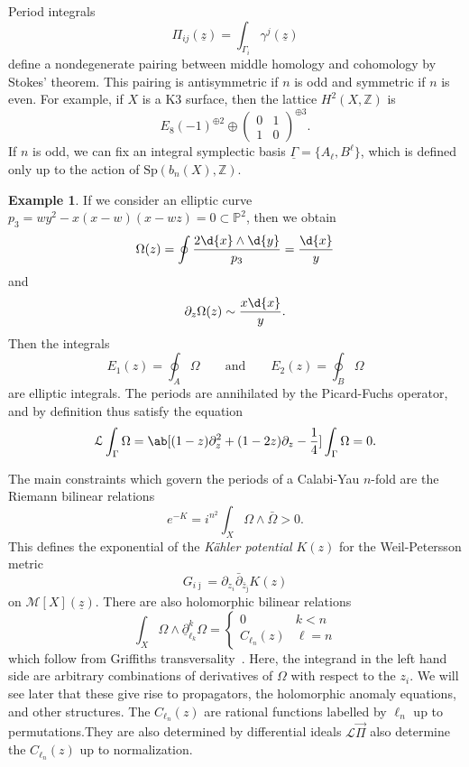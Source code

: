 \documentclass[10pt,oldfontcommands,oneside]{memoir}
\theoremstyle{definition}
\newtheorem{exm}[thm]{Example}
\theoremstyle{remark}
\theoremstyle{plain}
\theoremstyle{definition}
\theoremstyle{remark}
\newcommand{\Z}{\mathbb{Z}}
\renewcommand{\P}{\mathbb{P}}
\newcommand{\mc}[1]{\mathcal{#1}}
\newcommand{\uz}{\ul{z}}
\newcommand{\mr}[1]{\mathrm{#1}}
\newcommand{\ul}[1]{\underline{#1}}
\newcommand{\1}{\mathbf{1}}
\newcommand{\2}{\mathbf{2}}
\newcommand{\3}{\mathbf{3}}
\begin{document}
Period integrals
\[ \Pi_{ij}(\uz) = \int_{\Gamma_i} \gamma^j(\uz) \]
define a nondegenerate pairing between middle homology and cohomology by Stokes' theorem. This pairing is antisymmetric if $n$ is odd and symmetric if $n$ is even. For example, if $X$ is a K3 surface, then the lattice $H^2(X,\Z)$ is
\[ E_8(-1)^{\oplus 2} \oplus \begin{pmatrix}
    0 & 1 \\
    1 & 0
\end{pmatrix}^{\oplus 3}.
\]
If $n$ is odd, we can fix an integral symplectic basis $\ul{\Gamma} = \{A_{\ell}, B^{\ell}\}$, which is defined only up to the action of $\mr{Sp}(b_n(X), \Z)$.

\begin{exm}
    If we consider an elliptic curve $p_3 = wy^2-x(x-w)(x-wz) = 0 \subset \P^2$, then we obtain
    \[ \Omega(z) = \oint \frac{2 \d{x} \wedge \d{y}}{p_3} = \frac{\d{x}}{y} \]
    and
    \[ \partial_z \Omega(z) \sim \frac{x\d{x}}{y}. \]
    Then the integrals 
    \[ E_1(z) = \oint_A \Omega \qquad \text{and} \qquad E_2(z) = \oint_B \Omega \]
    are elliptic integrals. The periods are annihilated by the Picard-Fuchs operator, and by definition thus satisfy the equation
    \[ \mc{L} \int_{\Gamma} \Omega = \ab[(1-z)\partial_z^2 + (1-2z) \partial_z - \frac{1}{4}] \int_{\Gamma} \Omega = 0. \]
\end{exm}

The main constraints which govern the periods of a Calabi-Yau $n$-fold are the Riemann bilinear relations
\[ e^{-K} = i^{n^2} \int_X \Omega \wedge \bar{\Omega} > 0. \]
This defines the exponential of the \textit{K\"ahler potential} $K(z)$ for the Weil-Petersson metric
\[ G_{i\bar{\jmath}} = \partial_{z_i} \bar{\partial}_{\bar{z}_{\bar{\jmath}}} K(z) \]
on $\mc{M}[X](\uz)$. There are also holomorphic bilinear relations
\[ \int_X \Omega \wedge \ul{\partial}_{\ell_k}^k \Omega = \begin{cases}
    0 & k < n \\
    C_{\ell_n}(z) & \ell = n
\end{cases}
\]
which follow from Griffiths transversality~\cite{periods1,periods2}. Here, the integrand in the left hand side are arbitrary combinations of derivatives of $\Omega$ with respect to the $z_i$. We will see later that these give rise to propagators, the holomorphic anomaly equations, and other structures. The $C_{\ell_n}(z)$ are rational functions labelled by $\ell_n$ up to permutations.They are also determined by differential ideals $\mc{L}\vec{\Pi}$ also determine the $C_{\ell_n}(z)$ up to normalization.
\end{document}
